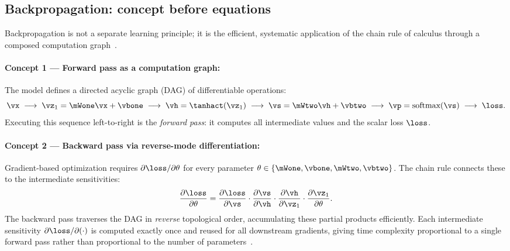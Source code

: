 \documentclass[sigconf,screen,nonacm]{acmart}
\begin{document}
\subsection{Backpropagation: concept before equations}
\label{sec:backprop-concept}

Backpropagation is not a separate learning principle; it is the efficient, systematic application of the chain rule of calculus through a composed computation graph~\cite{goodfellow2016deep,cs231n_backprop}.

\paragraph{Concept 1 --- Forward pass as a computation graph:}
The model defines a directed acyclic graph (DAG) of differentiable operations:
\begin{equation*}
    \vx \;\longrightarrow\; \vz_1 = \mWone\vx+\vbone \;\longrightarrow\; \vh = \tanhact(\vz_1) \;\longrightarrow\; \vs = \mWtwo\vh+\vbtwo \;\longrightarrow\; \vp = \text{softmax}(\vs) \;\longrightarrow\; \loss.
\end{equation*}
Executing this sequence left-to-right is the \emph{forward pass}: it computes all intermediate values and the scalar loss $\loss$.

\paragraph{Concept 2 --- Backward pass via reverse-mode differentiation:}
Gradient-based optimization requires $\partial \loss / \partial \theta$ for every parameter $\theta \in \{\mWone, \vbone, \mWtwo, \vbtwo\}$. The chain rule connects these to the intermediate sensitivities:
\begin{equation}
    \frac{\partial \loss}{\partial \theta} = \frac{\partial \loss}{\partial \vs} \cdot \frac{\partial \vs}{\partial \vh} \cdot \frac{\partial \vh}{\partial \vz_1} \cdot \frac{\partial \vz_1}{\partial \theta}.
    \label{eq:chain-rule}
\end{equation}
The backward pass traverses the DAG in \emph{reverse} topological order, accumulating these partial products efficiently. Each intermediate sensitivity $\partial \loss / \partial (\cdot)$ is computed exactly once and reused for all downstream gradients, giving time complexity proportional to a single forward pass rather than proportional to the number of parameters~\cite{cs231n_backprop}.
\end{document}
